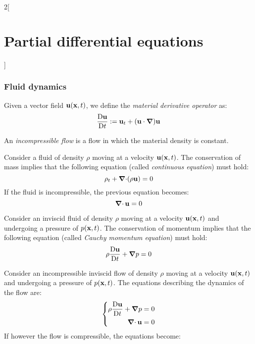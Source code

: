 \documentclass[../../../main_math.tex]{subfiles}
\begin{document}
\begin{multicols}{2}[\section{Partial differential equations}]
  \subsubsection{Fluid dynamics}
  \begin{definition}
    Given a vector field $\boldsymbol{\mathrm{u}}(\boldsymbol{\mathrm{x}},t)$, we define the \emph{material derivative operator} as: $$\frac{\mathrm{D}\boldsymbol{\mathrm{u}}}{\mathrm{D}t}:=\boldsymbol{\mathrm{u}}_t+(\boldsymbol{\mathrm{u}}\cdot\grad)\boldsymbol{\mathrm{u}}$$
  \end{definition}
  \begin{definition}
    An \emph{incompressible flow} is a flow in which the material density is constant.
  \end{definition}
  \begin{proposition}
    Consider a fluid of density $\rho$ moving at a velocity $\boldsymbol{\mathrm{u}}(\boldsymbol{\mathrm{x}},t)$. The conservation of mass implies that the following equation (called \emph{continuous equation}) must hold:
    \begin{equation}\label{PDE_continuous}
      \rho_t+\operatorname{\boldsymbol{\mathrm{\nabla}}\cdot}(\rho\boldsymbol{\mathrm{u}})=0
    \end{equation}
    If the fluid is incompressible, the previous equation becomes: $$\operatorname{\boldsymbol{\mathrm{\nabla}}\cdot}{\boldsymbol{\mathrm{u}}}=0$$
  \end{proposition}
  \begin{proposition}
    Consider an inviscid fluid of density $\rho$ moving at a velocity $\boldsymbol{\mathrm{u}}(\boldsymbol{\mathrm{x}},t)$ and undergoing a pressure of $p(\boldsymbol{\mathrm{x}},t)$. The conservation of momentum implies that the following equation (called \emph{Cauchy momentum equation}) must hold:
    \begin{equation}\label{PDE_cauchy}
      \rho\frac{\mathrm{D}\boldsymbol{\mathrm{u}}}{\mathrm{D}t}+\grad p=0
    \end{equation}
  \end{proposition}
  \begin{theorem}
    Consider an incompressible inviscid flow of density $\rho$ moving at a velocity $\boldsymbol{\mathrm{u}}(\boldsymbol{\mathrm{x}},t)$ and undergoing a pressure of $p(\boldsymbol{\mathrm{x}},t)$. The equations describing the dynamics of the flow are:
    \begin{equation*}
      \left\{
      \begin{aligned}
        \rho\frac{\mathrm{D}\boldsymbol{\mathrm{u}}}{\mathrm{D}t}+\grad p & =0 \\
        \operatorname{\boldsymbol{\mathrm{\nabla}}\cdot}{\boldsymbol{\mathrm{u}}}                 & =0
      \end{aligned}
      \right.
    \end{equation*}
    If however the flow is compressible, the equations become:
    \begin{equation*}

\end{equation*}
\end{theorem}
\end{multicols}
\end{document}
